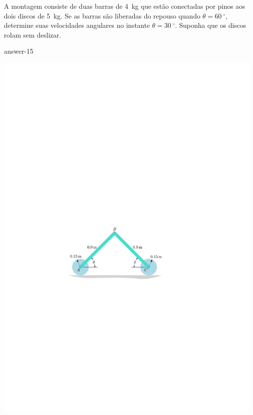 \item A montagem consiste de duas barras de \SI{4}{\kilogram} que estão conectadas por pinos aos dois discos de \SI{5}{\kilogram}.
Se as barras são liberadas do repouso quando $\theta=\SI{60}{^{\circ}}$, determine suas velocidades angulares no instante $\theta=\SI{30}{^{\circ}}$. Suponha que os discos rolam sem deslizar.

{answer-15}

\begin{flushright}
	\includegraphics[scale=1.2]{../../images/draw_7}
\end{flushright}